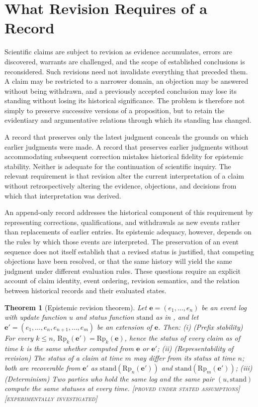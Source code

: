 \documentclass[11pt,twoside,openright]{book}
\theoremstyle{plain}
\newtheorem{theorem}{Theorem}[chapter]
\theoremstyle{definition}
\theoremstyle{remark}
\newcommand{\Proved}{\textup{\textsc{[proved under stated assumptions]}}}
\newcommand{\Tested}{\textup{\textsc{[experimentally investigated]}}}
\begin{document}
\section{What Revision Requires of a Record}

Scientific claims are subject to revision as evidence accumulates,
errors are discovered, warrants are challenged, and the scope of
established conclusions is reconsidered. Such revisions need not
invalidate everything that preceded them. A claim may be restricted
to a narrower domain, an objection may be answered without being
withdrawn, and a previously accepted conclusion may lose its
standing without losing its historical significance. The problem
is therefore not simply to preserve successive versions of a
proposition, but to retain the evidentiary and argumentative
relations through which its standing has changed.

A record that preserves only the latest judgment conceals the
grounds on which earlier judgments were made. A record that
preserves earlier judgments without accommodating subsequent
correction mistakes historical fidelity for epistemic stability.
Neither is adequate for the continuation of scientific inquiry.
The relevant requirement is that revision alter the current
interpretation of a claim without retrospectively altering the
evidence, objections, and decisions from which that interpretation
was derived.

An append-only record addresses the historical component of this
requirement by representing corrections, qualifications, and
withdrawals as new events rather than replacements of earlier
entries. Its epistemic adequacy, however, depends on the rules
by which those events are interpreted. The preservation of an
event sequence does not itself establish that a revised status
is justified, that competing objections have been resolved, or
that the same history will yield the same judgment under
different evaluation rules. These questions require an explicit
account of claim identity, event ordering, revision semantics,
and the relation between historical records and their
evaluated states.

\begin{theorem}[Epistemic revision theorem]\label{thm:revision}
Let $\mathbf{e}=(e_1,\dots,e_n)$ be an event log with update function $u$ and status function $\mathrm{stand}$ as in , and let $\mathbf{e}'=(e_1,\dots,e_n,e_{n+1},\dots,e_m)$ be an extension of $\mathbf{e}$. Then:
(i) (Prefix stability) For every $k\le n$, $\mathrm{Rp}_k(\mathbf{e}')=\mathrm{Rp}_k(\mathbf{e})$, hence the status of every claim as of time $k$ is the same whether computed from $\mathbf{e}$ or $\mathbf{e}'$; (ii) (Representability of revision) The status of a claim at time $m$ may differ from its status at time $n$; both are recoverable from $\mathbf{e}'$ as $\mathrm{stand}(\mathrm{Rp}_n(\mathbf{e}'))$ and $\mathrm{stand}(\mathrm{Rp}_m(\mathbf{e}'))$; (iii) (Determinism) Two parties who hold the same log and the same pair $(u,\mathrm{stand})$ compute the same statuses at every time.
\Proved{} \Tested{}
\end{theorem}
\end{document}
